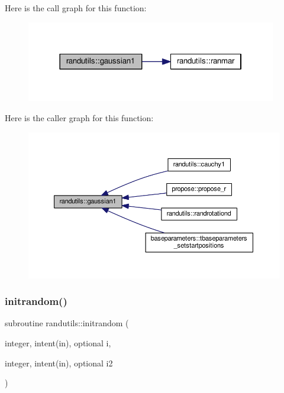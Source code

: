 Here is the call graph for this function\+:
\nopagebreak
\begin{figure}[H]
\begin{center}
\leavevmode
\includegraphics[width=310pt]{namespacerandutils_a9279fa2584213af31977f47ef3ea77e7_cgraph}
\end{center}
\end{figure}
Here is the caller graph for this function\+:
\nopagebreak
\begin{figure}[H]
\begin{center}
\leavevmode
\includegraphics[width=350pt]{namespacerandutils_a9279fa2584213af31977f47ef3ea77e7_icgraph}
\end{center}
\end{figure}
\mbox{\label{namespacerandutils_a6f074e631d2bdae8023911e26f56d7aa}} 
\subsubsection{\texorpdfstring{initrandom()}{initrandom()}}
{\footnotesize\ttfamily subroutine randutils\+::initrandom (\begin{DoxyParamCaption}\item[{integer, intent(in), optional}]{i,  }\item[{integer, intent(in), optional}]{i2 }\end{DoxyParamCaption})}



